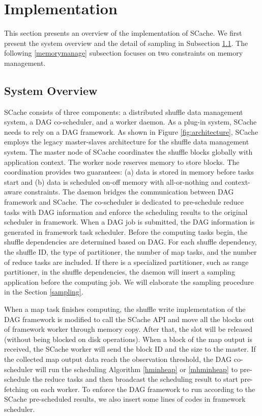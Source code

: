 \section{Implementation}\label{impl}
This section presents an overview of the implementation of SCache. 
{\color{black}
We first present the system overview and the detail of sampling in Subsection \ref{arch}. 
The following \ref{memorymanage} subsection focuses on two constraints on memory management.
}


\subsection{System Overview}\label{arch}
SCache consists of three components: a distributed shuffle data management system, a DAG co-scheduler, and a worker daemon. As a plug-in system, SCache needs to rely on a DAG framework.
As shown in Figure \ref{fig:architecture}, SCache employs the legacy master-slaves architecture for the shuffle data management system. 
The master node of SCache coordinates the shuffle blocks globally with application context. The worker node reserves memory to store blocks.
The coordination provides two guarantees: (a) data is stored in memory before tasks start and (b) data is scheduled on-off memory with all-or-nothing and context-aware constraints. 
The daemon bridges the communication between DAG framework and SCache. The co-scheduler is dedicated to pre-schedule reduce tasks with DAG information and enforce the scheduling results to the original scheduler in framework.
When a DAG job is submitted, the DAG information is generated in framework task scheduler. 
Before the computing tasks begin, the shuffle dependencies are determined based on DAG.
For each shuffle dependency, the shuffle ID, the type of partitioner, the number of map tasks, and the number of reduce tasks are included.  If there is a specialized partitioner, such as range partitioner, in the shuffle dependencies, the daemon will insert a sampling application before the {\color{black}computing job}. We will elaborate the sampling procedure in the Section \ref{sampling}.

{\color{blue}
When a map task finishes computing, the shuffle write implementation of the DAG framework is modified to call the SCache API and move all the blocks out of {\color{black}framework worker} through memory copy. 
After that, the slot will be released (without being blocked on disk operations).
When a block of the map output is received, the SCache worker will send the block ID and the size to the master.
If the collected map output data reach the observation threshold, the DAG co-scheduler will run the scheduling Algorithm \ref{hminheap} or \ref{mhminheap} to pre-schedule the reduce tasks and then broadcast the scheduling result to start pre-fetching on each worker.
To enforce the DAG framework to run according to the SCache pre-scheduled results, we also insert some lines of codes in framework scheduler.
}

